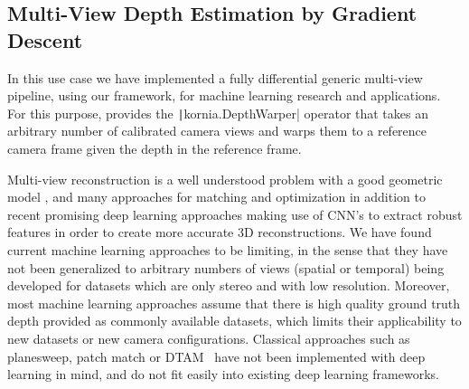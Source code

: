 \subsection{Multi-View Depth Estimation by Gradient Descent}
%
In this use case we have implemented a fully differential generic multi-view pipeline, using our framework,  for machine learning research and applications. For this purpose, \lib{} provides the \texttt|kornia.DepthWarper| operator that takes an arbitrary number of calibrated camera views and warps them to a reference camera frame given the depth in the reference frame.

Multi-view reconstruction is a well understood problem with a good geometric model \citep{Hartley_MVG}, and many approaches for matching and optimization \citep{dtam_Newcombe2011, patchmatch-stereo, Sevilla-LaraSJB16} in addition to recent promising deep learning approaches \citep{Luo2016} making use of CNN's to extract robust features in order to create more accurate 3D reconstructions. We have found current machine learning approaches \citep{FischerDIHHGSCB15, IlgMSKDB16} to be limiting, in the sense that they have not been generalized to arbitrary numbers of views (spatial or temporal) being developed for datasets which are only stereo and with low resolution. Moreover, most machine learning approaches assume that there is high quality ground truth depth provided as commonly available datasets, which limits
their applicability to new datasets or new camera configurations. Classical approaches such as planesweep, patch match or DTAM~\citep{Newcombe:2011:DDT:2355573.2356447} have not been implemented with deep learning in mind, and do not fit easily into existing deep learning frameworks.\\

